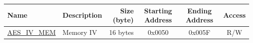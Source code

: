 \begin{longtable}{ |p{3cm} | p{3cm} | r | c | c | c |  }
\hline
\rowcolor{lightgray}
Name & Description  &  Size (byte)  &  Starting Address  &  Ending Address  & Access   \\ \hline
{\hyperref[memdesc:AESIVMEM]{AES\_IV\_MEM}} & Memory IV & 16 bytes  & 0x0050 & 0x005F & R/W \\ \hline
\end{longtable}
